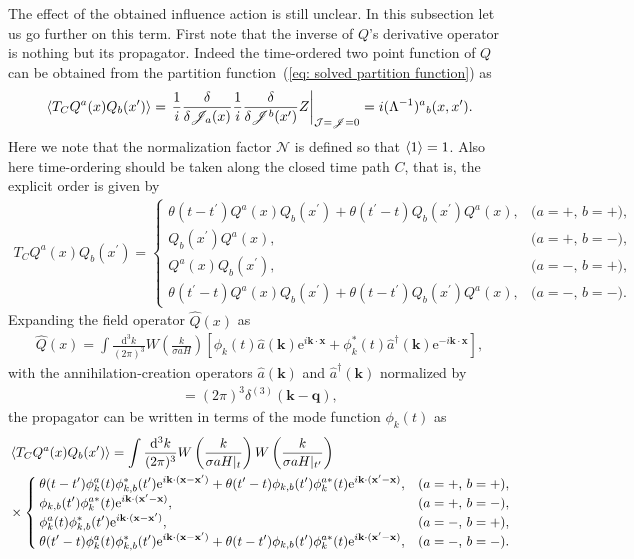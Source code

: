 \documentclass[aps, prd
, preprint
, nofootinbib 
]{revtex4-1}
\newcommand{\dd}{\mathrm{d}}
\newcommand{\ee}{\mathrm{e}}
\newcommand{\dk}{\frac{\dd^3k}{(2\pi)^3}}
\newcommand{\bae}[1]{\begin{align} #1 \end{align}}
\newcommand{\bce}[1]{\begin{cases} #1 \end{cases}}
\begin{document}
The effect of the obtained influence action is still unclear. In this subsection let us go further on this term.
First note that the inverse of $Q$'s derivative operator is nothing but its propagator.
Indeed the time-ordered two point function of $Q$ can be obtained from the partition function~(\ref{eq: solved partition function}) as
\bae{
	\braket{T_CQ^a(x)Q_b(x^\prime)}=\left.\frac{1}{i}\frac{\delta}{\delta\mathscr{J}_a(x)}
	\frac{1}{i}\frac{\delta}{\delta\mathscr{J}^b(x^\prime)}Z\right|_{\mathcal{J}=\mathscr{J}=0}
	=i(\Lambda^{-1})^a{}_b(x,x^\prime).
}
Here we note that the normalization factor $\mathcal{N}$ is defined so that $\braket{1}=1$.
Also here time-ordering should be taken along the closed time path $C$, that is, the explicit order is given by
\bae{
	T_CQ^a(x)Q_b(x^\prime)=
	\bce{
		\displaystyle
		\theta(t-t^\prime)Q^a(x)Q_b(x^\prime)+\theta(t^\prime-t)Q_b(x^\prime)Q^a(x), & \text{($a=+$, $b=+$),} \\
		\displaystyle
		Q_b(x^\prime)Q^a(x), & \text{($a=+$, $b=-$),} \\
		\displaystyle
		Q^a(x)Q_b(x^\prime), & \text{($a=-$, $b=+$),} \\
		\displaystyle
		\theta(t^\prime-t)Q^a(x)Q_b(x^\prime)+\theta(t-t^\prime)Q_b(x^\prime)Q^a(x), & \text{($a=-$, $b=-$).}
	}
}
Expanding the field operator $\hat{Q}(x)$ as 
\bae{
	\hat{Q}(x)=\int\dk W\left(\frac{k}{\sigma aH}\right)\left[\phi_k(t)\hat{a}(\mathbf{k})\ee^{i\mathbf{k}\cdot\mathbf{x}}
	+\phi_k^*(t)\hat{a}^\dagger(\mathbf{k})\ee^{-i\mathbf{k}\cdot\mathbf{x}}\right],
}
with the annihilation-creation operators $\hat{a}(\mathbf{k})$ and $\hat{a}^\dagger(\mathbf{k})$ normalized by
\bae{
	[\hat{a}(\mathbf{k}),\hat{a}^\dagger(\mathbf{q})]=(2\pi)^3\delta^{(3)}(\mathbf{k}-\mathbf{q}),
}
the propagator can be written in terms of the mode function $\phi_k(t)$ as
\bae{
	&\braket{T_CQ^a(x)Q_b(x^\prime)}=\int\dk W\left(\frac{k}{\sigma aH|_t}\right)W\left(\frac{k}{\sigma aH|_{t^\prime}}\right) \nonumber \\
	&\times
	\bce{
		\displaystyle
		\theta(t-t^\prime)\phi_k^a(t)\phi_{k,b}^*(t^\prime)\ee^{i\mathbf{k}\cdot(\mathbf{x}-\mathbf{x}^\prime)}
		+\theta(t^\prime-t)\phi_{k,b}(t^\prime)\phi_k^{a*}(t)\ee^{i\mathbf{k}\cdot(\mathbf{x}^\prime-\mathbf{x})}, &
		\text{($a=+$, $b=+$)}, \\
		\displaystyle
		\phi_{k,b}(t^\prime)\phi_k^{a*}(t)\ee^{i\mathbf{k}\cdot(\mathbf{x}^\prime-\mathbf{x})}, &
		\text{($a=+$, $b=-$)}, \\
		\displaystyle
		\phi_k^a(t)\phi_{k,b}^*(t^\prime)\ee^{i\mathbf{k}\cdot(\mathbf{x}-\mathbf{x}^\prime)}, &
		\text{($a=-$, $b=+$)}, \\
		\displaystyle
		\theta(t^\prime-t)\phi_k^a(t)\phi_{k,b}^*(t^\prime)\ee^{i\mathbf{k}\cdot(\mathbf{x}-\mathbf{x}^\prime)}
		+\theta(t-t^\prime)\phi_{k,b}(t^\prime)\phi_k^{a*}(t)\ee^{i\mathbf{k}\cdot(\mathbf{x}^\prime-\mathbf{x})}, &
		\text{($a=-$, $b=-$)}.
	}
}
\end{document}
